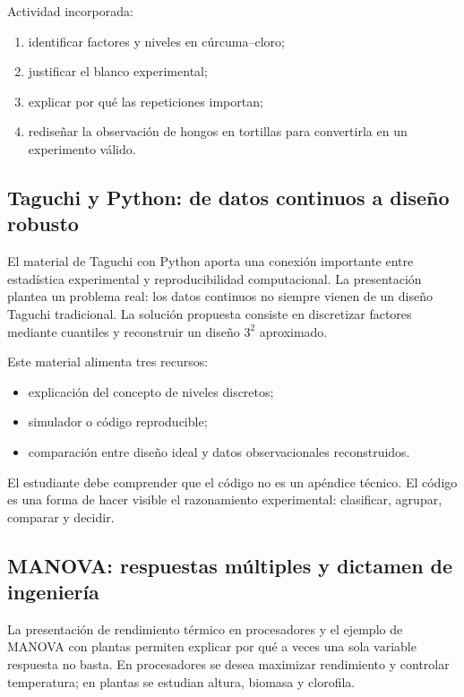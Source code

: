 Actividad incorporada:

\begin{enumerate}
  \item identificar factores y niveles en cúrcuma--cloro;
  \item justificar el blanco experimental;
  \item explicar por qué las repeticiones importan;
  \item rediseñar la observación de hongos en tortillas para convertirla en un experimento válido.
\end{enumerate}

\subsection{Taguchi y Python: de datos continuos a diseño robusto}

El material de Taguchi con Python aporta una conexión importante entre estadística experimental y reproducibilidad computacional. La presentación plantea un problema real: los datos continuos no siempre vienen de un diseño Taguchi tradicional. La solución propuesta consiste en discretizar factores mediante cuantiles y reconstruir un diseño \(3^2\) aproximado.

Este material alimenta tres recursos:

\begin{itemize}
  \item explicación del concepto de niveles discretos;
  \item simulador o código reproducible;
  \item comparación entre diseño ideal y datos observacionales reconstruidos.
\end{itemize}

\begin{idea}
El estudiante debe comprender que el código no es un apéndice técnico. El código es una forma de hacer visible el razonamiento experimental: clasificar, agrupar, comparar y decidir.
\end{idea}

\subsection{MANOVA: respuestas múltiples y dictamen de ingeniería}

La presentación de rendimiento térmico en procesadores y el ejemplo de MANOVA con plantas permiten explicar por qué a veces una sola variable respuesta no basta. En procesadores se desea maximizar rendimiento y controlar temperatura; en plantas se estudian altura, biomasa y clorofila.

